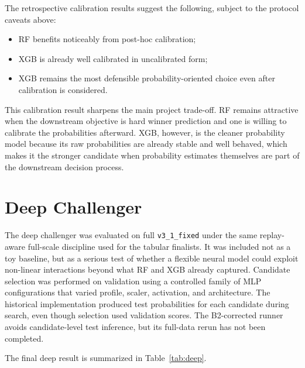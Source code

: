 \documentclass[11pt,a4paper]{article}
\begin{document}
The retrospective calibration results suggest the following, subject to the protocol caveats above:
\begin{itemize}
    \item RF benefits noticeably from post-hoc calibration;
    \item XGB is already well calibrated in uncalibrated form;
    \item XGB remains the most defensible probability-oriented choice even after calibration is considered.
\end{itemize}

This calibration result sharpens the main project trade-off. RF remains attractive when the downstream objective is hard winner prediction and one is willing to calibrate the probabilities afterward. XGB, however, is the cleaner probability model because its raw probabilities are already stable and well behaved, which makes it the stronger candidate when probability estimates themselves are part of the downstream decision process.

\section{Deep Challenger}
The deep challenger was evaluated on full \texttt{v3\_1\_fixed} under the same replay-aware full-scale discipline used for the tabular finalists. It was included not as a toy baseline, but as a serious test of whether a flexible neural model could exploit non-linear interactions beyond what RF and XGB already captured. Candidate selection was performed on validation using a controlled family of MLP configurations that varied profile, scaler, activation, and architecture. The historical implementation produced test probabilities for each candidate during search, even though selection used validation scores. The B2-corrected runner avoids candidate-level test inference, but its full-data rerun has not been completed.

The final deep result is summarized in Table~\ref{tab:deep}.

\begin{table}[H]
\centering
\caption{Deep finalist result on full \texttt{v3\_1\_fixed}. Mean $\pm$ standard deviation over seeds 42, 43, and 44.}
\label{tab:deep}
\small
\setlength{\tabcolsep}{4pt}
\normalsize
\end{table}
\end{document}
